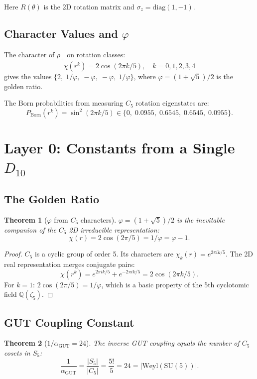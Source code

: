 \documentclass[11pt,a4paper]{article}
\newtheorem{theorem}{Theorem}
\begin{document}
Here $R(\theta)$ is the 2D rotation matrix and $\sigma_z = \text{diag}(1, -1)$.

\subsection{Character Values and $\varphi$}

The character of $\rho_+$ on rotation classes:
\[
\chi(r^k) = 2\cos(2\pi k/5), \quad k = 0, 1, 2, 3, 4
\]
gives the values $\{2,\; 1/\varphi,\; -\varphi,\; -\varphi,\; 1/\varphi\}$, where $\varphi = (1+\sqrt{5})/2$ is the golden ratio.

The Born probabilities from measuring $C_5$ rotation eigenstates are:
\[
P_{\text{Born}}(r^k) = \sin^2(2\pi k/5) \in \{0,\; 0.0955,\; 0.6545,\; 0.6545,\; 0.0955\}.
\]

\section{Layer 0: Constants from a Single $D_{10}$}
\label{sec:layer0}

\subsection{The Golden Ratio}

\begin{theorem}[$\varphi$ from $C_5$ characters]
$\varphi = (1+\sqrt{5})/2$ is the inevitable companion of the $C_5$ 2D irreducible representation:
\[
\chi(r) = 2\cos(2\pi/5) = 1/\varphi = \varphi - 1.
\]
\end{theorem}

\begin{proof}
$C_5$ is a cyclic group of order 5. Its characters are $\chi_k(r) = e^{2\pi i k/5}$. The 2D real representation merges conjugate pairs:
\[
\chi(r^k) = e^{2\pi i k/5} + e^{-2\pi i k/5} = 2\cos(2\pi k/5).
\]
For $k=1$: $2\cos(2\pi/5) = 1/\varphi$, which is a basic property of the 5th cyclotomic field $\mathbb{Q}(\zeta_5)$.
\end{proof}

\subsection{GUT Coupling Constant}

\begin{theorem}[$1/\alpha_{\text{GUT}} = 24$]
\label{thm:gut}
The inverse GUT coupling equals the number of $C_5$ cosets in $S_5$:
\[
\frac{1}{\alpha_{\text{GUT}}} = \frac{|S_5|}{|C_5|} = \frac{5!}{5} = 24 = |\text{Weyl}(\text{SU}(5))|.
\]
\end{theorem}
\end{document}
